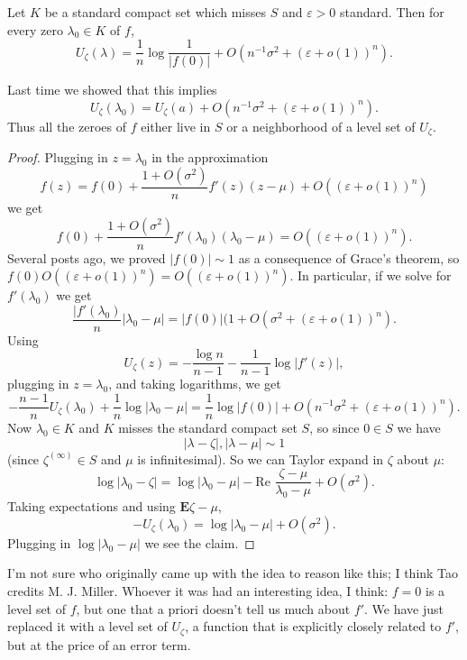 \documentclass[12pt]{article}
\begin{document}
\begin{lemma}
Let $K$ be a standard compact set which misses $S$ and $\varepsilon > 0$ standard. Then for every zero $\lambda_0 \in K$ of $f$,
$$U_\zeta(\lambda) = \frac{1}{n} \log \frac{1}{|f(0)|} + O(n^{-1}\sigma^2 + (\varepsilon + o(1))^n).$$
\end{lemma}
Last time we showed that this implies
$$U_\zeta(\lambda_0) = U_\zeta(a) + O(n^{-1}\sigma^2 + (\varepsilon + o(1))^n).$$
Thus all the zeroes of $f$ either live in $S$ or a neighborhood of a level set of $U_\zeta$.
\begin{proof}
Plugging in $z = \lambda_0$ in the approximation
$$f(z) = f(0) + \frac{1 + O(\sigma^2)}{n} f'(z) (z - \mu) + O((\varepsilon + o(1))^n)$$
we get
$$f(0) + \frac{1 + O(\sigma^2)}{n} f'(\lambda_0) (\lambda_0 - \mu) = O((\varepsilon + o(1))^n).$$
Several posts ago, we proved $|f(0)| \sim 1$ as a consequence of Grace's theorem, so $f(0)O((\varepsilon + o(1))^n) = O((\varepsilon + o(1))^n)$.
In particular, if we solve for $f'(\lambda_0)$ we get
$$\frac{|f'(\lambda_0)}{n} |\lambda_0 - \mu| = |f(0)| (1 + O(\sigma^2 + (\varepsilon + o(1))^n).$$
Using
$$U_\zeta(z) = -\frac{\log n}{n - 1} - \frac{1}{n - 1} \log |f'(z)|,$$
plugging in $z = \lambda_0$, and taking logarithms, we get
$$-\frac{n - 1}{n} U_\zeta(\lambda_0) + \frac{1}{n} \log | \lambda_0 - \mu| = \frac{1}{n} \log |f(0)| + O(n^{-1}\sigma^2 + (\varepsilon + o(1))^n).$$
Now $\lambda_0 \in K$ and $K$ misses the standard compact set $S$, so since $0 \in S$ we have
$$|\lambda - \zeta|, |\lambda - \mu| \sim 1$$
(since $\zeta^{(\infty)} \in S$ and $\mu$ is infinitesimal).
So we can Taylor expand in $\zeta$ about $\mu$:
$$\log |\lambda_0 - \zeta| = \log |\lambda_0 - \mu| - \text{Re }\frac{\zeta - \mu}{\lambda_0 - \mu} + O(\sigma^2).$$
Taking expectations and using $\mathbf E \zeta - \mu$,
$$-U_\zeta(\lambda_0) = \log |\lambda_0 - \mu| + O(\sigma^2).$$
Plugging in $\log |\lambda_0 - \mu|$ we see the claim.
\end{proof}

I'm not sure who originally came up with the idea to reason like this; I think Tao credits M. J. Miller.
Whoever it was had an interesting idea, I think: $f = 0$ is a level set of $f$, but one that a priori doesn't tell us much about $f'$.
We have just replaced it with a level set of $U_\zeta$, a function that is explicitly closely related to $f'$, but at the price of an error term.
\end{document}
